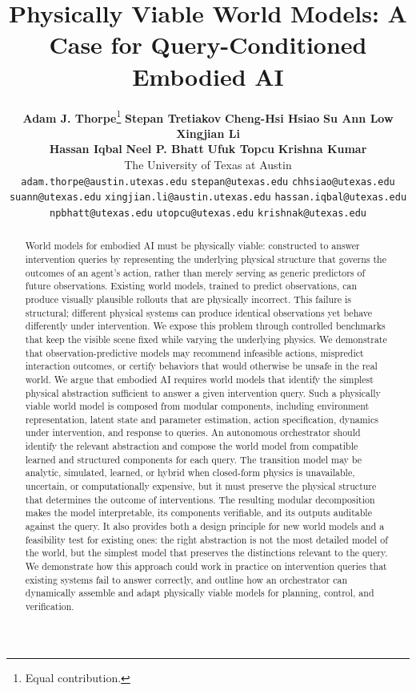 \documentclass{article}
\title{Physically Viable World Models: A Case for Query-Conditioned Embodied AI}
\author{%
\textbf{Adam J. Thorpe}\thanks{Equal contribution.} \quad
\textbf{Stepan Tretiakov}\footnotemark[1] \quad
\textbf{Cheng-Hsi Hsiao} \quad
\textbf{Su Ann Low} \quad
\textbf{Xingjian Li} \\
\textbf{Hassan Iqbal} \quad
\textbf{Neel P. Bhatt} \quad
\textbf{Ufuk Topcu} \quad
\textbf{Krishna Kumar} \\
\normalfont The University of Texas at Austin \\
\normalfont\texttt{adam.thorpe@austin.utexas.edu} \quad
\normalfont\texttt{stepan@utexas.edu} \quad
\normalfont\texttt{chhsiao@utexas.edu} \\
\normalfont\texttt{suann@utexas.edu} \quad
\normalfont\texttt{xingjian.li@austin.utexas.edu} \quad
\normalfont\texttt{hassan.iqbal@utexas.edu} \\
\normalfont\texttt{npbhatt@utexas.edu} \quad
\normalfont\texttt{utopcu@utexas.edu} \quad
\normalfont\texttt{krishnak@utexas.edu}
}
\begin{document}
\maketitle


\begin{abstract}
World models for embodied AI must be physically viable: constructed to answer intervention queries by representing the underlying physical structure that governs the outcomes of an agent's action, rather than merely serving as generic predictors of future observations. Existing world models, trained to predict observations, can produce visually plausible rollouts that are physically incorrect. This failure is structural; different physical systems can produce identical observations yet behave differently under intervention. We expose this problem through controlled benchmarks that keep the visible scene fixed while varying the underlying physics. We demonstrate that observation-predictive models may recommend infeasible actions, mispredict interaction outcomes, or certify behaviors that would otherwise be unsafe in the real world. We argue that embodied AI requires world models that identify the simplest physical abstraction sufficient to answer a given intervention query. Such a physically viable world model is composed from modular components, including environment representation, latent state and parameter estimation, action specification, dynamics under intervention, and response to queries. An autonomous orchestrator should identify the relevant abstraction and compose the world model from compatible learned and structured components for each query. The transition model may be analytic, simulated, learned, or hybrid when closed-form physics is unavailable, uncertain, or computationally expensive, but it must preserve the physical structure that determines the outcome of interventions. The resulting modular decomposition makes the model interpretable, its components verifiable, and its outputs auditable against the query. It also provides both a design principle for new world models and a feasibility test for existing ones: the right abstraction is not the most detailed model of the world, but the simplest model that preserves the distinctions relevant to the query. We demonstrate how this approach could work in practice on intervention queries that existing systems fail to answer correctly, and outline how an orchestrator can dynamically assemble and adapt physically viable models for planning, control, and verification.
\end{abstract}
\end{document}
